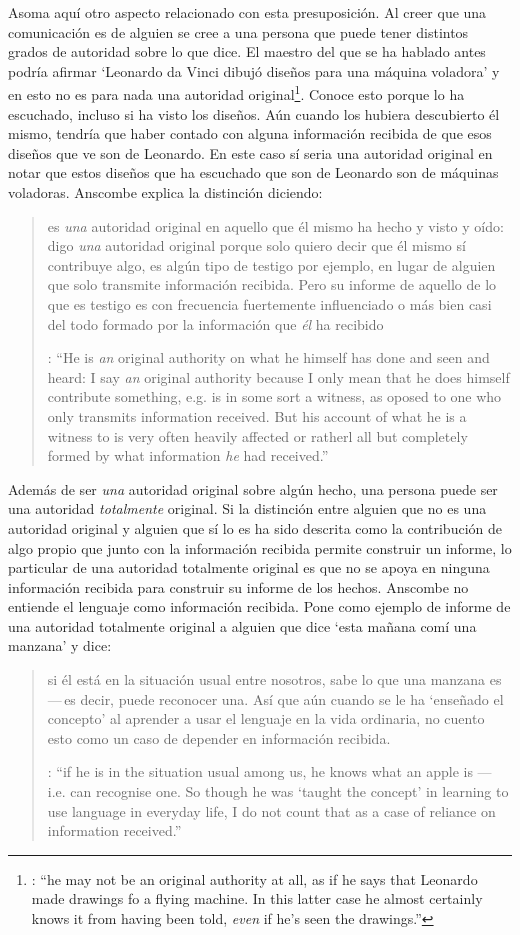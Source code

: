 Asoma aquí otro aspecto relacionado con esta presuposición. Al creer que una comunicación es de alguien se cree a una persona que puede tener distintos grados de autoridad sobre lo que dice. El maestro del que se ha hablado antes podría afirmar \enquote*{Leonardo da Vinci dibujó diseños para una máquina voladora} y en esto no es para nada una autoridad original\footnote{\cite[Cf.~][6]{anscombe2008faith:tobelieve}: \enquote{he may not be an original authority at all, as if he says that Leonardo made drawings fo a flying machine. In this latter case he almost certainly knows it from having been told, \emph{even} if he's seen the drawings.}}. Conoce esto porque lo ha escuchado, incluso si ha visto los diseños. Aún cuando los hubiera descubierto él mismo, tendría que haber contado con alguna información recibida de que esos diseños que ve son de Leonardo. En este caso sí seria una autoridad original en notar que estos diseños que ha escuchado que son de Leonardo son de máquinas voladoras. Anscombe explica la distinción diciendo: \blockquote[{\cite[5]{anscombe2008faith:tobelieve}}: \enquote{He is \emph{an} original authority on what he himself has done and seen and heard: I say \emph{an} original authority because I only mean that he does himself contribute something, e.g. is in some sort a witness, as oposed to one who only transmits information received. But his account of what he is a witness to is very often \textelp{} heavily affected or ratherl all but completely formed by what information \emph{he} had received.}]{ es \emph{una} autoridad original en aquello que él mismo ha hecho y visto y oído: digo \emph{una} autoridad original porque solo quiero decir que él mismo sí contribuye algo, es algún tipo de testigo por ejemplo, en lugar de alguien que solo transmite información recibida. Pero su informe de aquello de lo que es testigo es con frecuencia \textelp{} fuertemente influenciado o más bien casi del todo formado por la información que \emph{él} ha recibido} Además de ser \emph{una} autoridad original sobre algún hecho, una persona puede ser una autoridad \emph{totalmente} original. Si la distinción entre alguien que no es una autoridad original y alguien que sí lo es ha sido descrita como la contribución de algo propio que junto con la información recibida permite construir un informe, lo particular de una autoridad totalmente original es que no se apoya en ninguna información recibida para construir su informe de los hechos. Anscombe no entiende el lenguaje como información recibida. Pone como ejemplo de informe de una autoridad totalmente original a alguien que dice \enquote*{esta mañana comí una manzana} y dice: \blockquote[{\cite[6]{anscombe2008faith:tobelieve}}: \enquote{if he is in the situation usual among us, he knows what an apple is --- i.e. can recognise one. So though he was `taught the concept' in learning to use language in everyday life, I do not count that as a case of reliance on information received.}]{si él está en la situación usual entre nosotros, sabe lo que una manzana es\,---\,es decir, puede reconocer una. Así que aún cuando se le ha `enseñado el concepto' al aprender a usar el lenguaje en la vida ordinaria, no cuento esto como un caso de depender en información recibida.}

